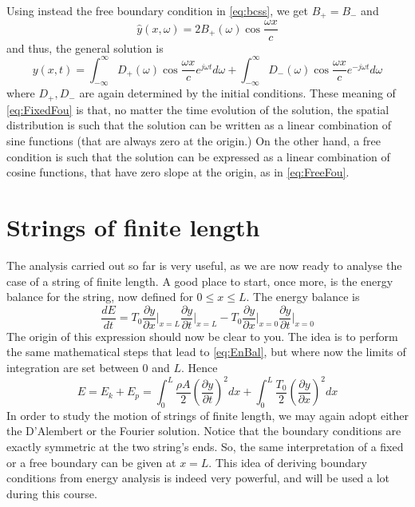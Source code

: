\medskip
\medskip


\noindent Using instead the free boundary condition in \eqref{eq:bcss}, we get $B_+ = B_-$ and
\begin{equation}\label{eq:FreeFou}
\hat y(x,\omega) = 2 B_+(\omega) \cos \frac{\omega x}{c}
\end{equation}
and thus, the general solution is
\begin{equation}\label{eq:FreeFou}
y(x,t)= \int_{-\infty}^{\infty} D_+(\omega) \cos\frac{\omega x}{c} e^{j\omega t} d\omega +  \int_{-\infty}^{\infty} D_-(\omega) \cos\frac{\omega x}{c} e^{-j\omega t} d\omega
\end{equation}
where $D_+,D_-$ are again determined by the initial conditions.
These meaning of \eqref{eq:FixedFou} is that, no matter the time evolution of the solution, the spatial distribution is such that the solution can be written as a linear combination of sine functions (that are always zero at the origin.) On the other hand, a free condition is such that the solution can be expressed as a linear combination of cosine functions, that have zero slope at the origin, as in \eqref{eq:FreeFou}.


\section{Strings of finite length}

The analysis carried out so far is very useful, as we are now ready to analyse the case of a string of finite length. A good place to start, once more, is the energy balance for the string, now defined for $0\leq x \leq L$. The energy balance is
\begin{equation}\label{eq:EnBalFull}
\frac{dE}{dt} = T_0 \frac{\partial y}{\partial x }\Bigg|_{x=L}\frac{\partial y}{\partial t }\Bigg|_{x=L} - T_0 \frac{\partial y}{\partial x }\Bigg|_{x=0}\frac{\partial y}{\partial t }\Bigg|_{x=0}
\end{equation}
The origin of this expression should now be clear to you. The idea is to perform the same mathematical steps that lead to \eqref{eq:EnBal}, but where now the limits of integration are set between $0$ and $L$. Hence
\begin{equation}\label{eq:EnFinite}
E = E_k + E_p = \int_{0}^{L} \frac{\rho A}{2}\left( \frac{\partial y}{\partial t} \right)^2 dx + \int_{0}^{L} \frac{T_0}{2}\left( \frac{\partial y}{\partial x} \right)^2 dx
\end{equation}
In order to study the motion of strings of finite length, we may again adopt either the D'Alembert or the Fourier solution. Notice that the boundary conditions are exactly symmetric at the two string's ends. So, the same interpretation of a fixed or a free boundary can be given at $x=L$. This idea of deriving boundary conditions from energy analysis is indeed very powerful, and will be used a lot during this course.


